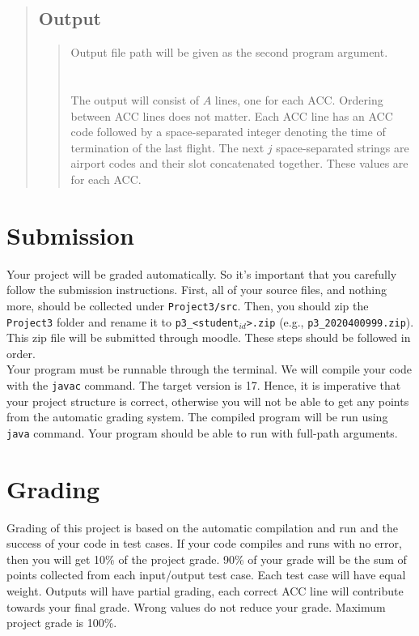 \documentclass[10pt]{article}
\begin{document}
\begin{quote}
\subsection{Output}
\begin{quote}
Output file path will be given as the second program argument. \\

\vspace{-0.2cm}
\\  \\
The output will consist of $A$ lines, one for each ACC. Ordering between ACC lines does not matter. Each ACC line has an ACC code followed by a space-separated integer denoting the time of termination of the last flight. The next $j$ space-separated strings are airport codes and their slot concatenated together. These values are for each ACC. 

\end{quote}

\end{quote}

\section{Submission}

\indent \indent Your project will be graded automatically. So it's important that you carefully follow the submission instructions. First, all of your source files, and nothing more, should be collected under \verb|Project3/src|. Then, you should zip the \verb|Project3| folder and rename it to \texttt{p3\_<student$_{id}$>.zip} (e.g., \verb|p3_2020400999.zip|). This zip file will be submitted through moodle. These steps should be followed in order. \\

Your program must be runnable through the terminal. We will compile your code with the \texttt{javac} command. The target version is 17. Hence, it is imperative that your project structure is correct, otherwise you will not be able to get any points from the automatic grading system.  The compiled program will be run using \texttt{java} command. Your program should be able to run with full-path arguments.

\section{Grading}

\indent \indent Grading of this project is based on the automatic compilation and run and the success of your code in test cases. If your code compiles and runs with no error, then you will get 10\% of the project grade. 90\% of your grade will be the sum of points collected from each input/output test case. Each test case will have equal weight. Outputs will have partial grading, each correct ACC line will contribute towards your final grade. Wrong values do not reduce your grade. Maximum project grade is 100\%. 
\end{document}
